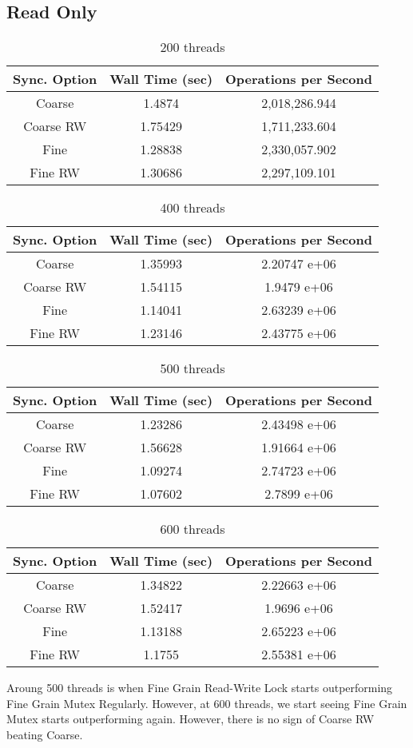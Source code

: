 \documentclass[11pt]{article}
\begin{document}
\subsection{Read Only}
\begin{table}[H]
	\centering
	\begin{tabular}{|c|c|c|}
		\hline
		Sync. Option &Wall Time (sec)	&Operations per Second	\\
		\hline
		Coarse &1.4874	&2,018,286.944\\
		\hline
		Coarse RW &1.75429 &1,711,233.604\\
		\hline
		Fine	&1.28838	&2,330,057.902\\
		\hline
		Fine RW	&1.30686	&2,297,109.101\\
		\hline
	\end{tabular}
	\caption{200 threads}
\end{table}
\begin{table}[H]
	\centering
	\begin{tabular}{|c|c|c|}
		\hline
		Sync. Option &Wall Time (sec)	&Operations per Second	\\
		\hline
		Coarse &1.35993	&2.20747 e+06\\
		\hline
		Coarse RW &1.54115 &1.9479 e+06\\
		\hline
		Fine	&1.14041	&2.63239 e+06\\
		\hline
		Fine RW	&1.23146	&2.43775 e+06\\
		\hline
	\end{tabular}
	\caption{400 threads}
\end{table}
\begin{table}[H]
	\centering
	\begin{tabular}{|c|c|c|}
		\hline
		Sync. Option &Wall Time (sec)	&Operations per Second	\\
		\hline
		Coarse &1.23286	&2.43498 e+06\\
		\hline
		Coarse RW &1.56628 &1.91664 e+06\\
		\hline
		Fine	&1.09274	&2.74723 e+06\\
		\hline
		Fine RW	&1.07602	&2.7899 e+06\\
		\hline
	\end{tabular}
	\caption{500 threads}
\end{table}
\begin{table}[H]
	\centering
	\begin{tabular}{|c|c|c|}
		\hline
		Sync. Option &Wall Time (sec)	&Operations per Second	\\
		\hline
		Coarse & 1.34822 &2.22663 e+06\\
		\hline
		Coarse RW &1.52417 &1.9696 e+06\\
		\hline
		Fine	&1.13188	&2.65223 e+06\\
		\hline
		Fine RW	&1.1755	&2.55381 e+06\\
		\hline
	\end{tabular}
	\caption{600 threads}
\end{table}
Aroung 500 threads is when Fine Grain Read-Write Lock starts outperforming Fine Grain Mutex Regularly. However, at 600 threads, we start seeing Fine Grain Mutex starts outperforming again. However, there is no sign of Coarse RW beating Coarse. 
\end{document}
